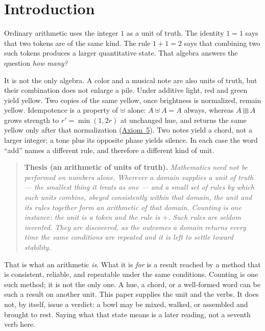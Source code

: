 \documentclass[12pt, a4paper]{article}
\begin{document}
\section{Introduction}

Ordinary arithmetic uses the integer $1$ as a unit of truth.
The identity $1=1$ says that two tokens are of the same kind.
The rule $1+1=2$ says that combining two such tokens produces a
larger quantitative state. That algebra answers the question
\emph{how many?}

It is not the only algebra. A color and a musical note are also
units of truth, but their combination does not enlarge a pile.
Under additive light, red and green yield yellow. Two copies of
the same yellow, once brightness is normalized, remain yellow.
Idempotence is a property of $\uplus$ alone: $A\uplus A=A$ always,
whereas $A\boxplus A$ grows strength to $r'=\min(1,2r)$ at unchanged
hue, and returns the same yellow only after that normalization
(\hyperref[subsec:axiom_interference]{Axiom~5}).
Two notes yield a chord, not a larger integer; a tone plus its
opposite phase yields silence. In each case the word ``add''
names a different rule, and therefore a different kind of unit.

\begin{quote}
\textbf{Thesis (an arithmetic of units of truth).}
\emph{Mathematics need not be performed on numbers alone. Wherever a
domain supplies a unit of truth --- the smallest thing it treats as
one --- and a small set of rules by which such units combine, obeyed
consistently within that domain, the unit and its rules together form
an arithmetic of that domain. Counting is one instance: the unit is a
token and the rule is $+$. Such rules are seldom invented. They are
discovered, as the outcomes a domain returns every time the same
conditions are repeated and it is left to settle toward stability.}
\end{quote}

That is what an arithmetic \emph{is}. What it is \emph{for} is a
result reached by a method that is consistent, reliable, and
repeatable under the same conditions. Counting is one such method; it
is not the only one. A hue, a chord, or a well-formed word can be
such a result on another unit. This paper supplies the unit and the
verbs. It does not, by itself, issue a verdict: a bowl may be mixed,
walked, or assembled and brought to rest. Saying what that state
means is a later reading, not a seventh verb here.
\end{document}
